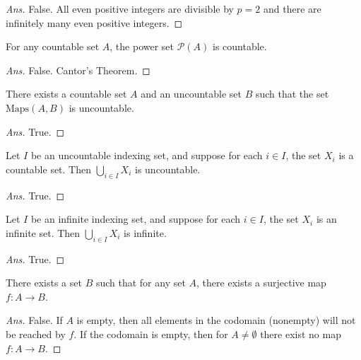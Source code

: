 \documentclass[12pt]{article}
\newenvironment{problem}[2][Problem]{\begin{trivlist}
\item[\hskip \labelsep {\bfseries #1}\hskip \labelsep {\bfseries #2.}]}{\end{trivlist}}
\begin{document}
\begin{proof}[Ans]
False. All even positive integers are divisible by $p = 2$ and there are infinitely many even positive integers.
\end{proof}

\begin{problem}{35}
For any countable set $A$, the power set $\mathcal{P}(A)$ is countable.
\end{problem}

\begin{proof}[Ans]
False. Cantor's Theorem.
\end{proof}

\begin{problem}{36}
There exists a countable set $A$ and an uncountable set $B$ such that the set $\text{Maps}(A, B)$ is uncountable.
\end{problem}

\begin{proof}[Ans]
True.
\end{proof}

\begin{problem}{37}
Let $I$ be an uncountable indexing set, and suppose for each $i \in I$, the set $X_i$ is a countable set. Then $\bigcup_{i \in I} X_i$ is uncountable.
\end{problem}

\begin{proof}[Ans]
True.
\end{proof}

\begin{problem}{38}
Let $I$ be an infinite indexing set, and suppose for each $i \in I$, the set $X_i$ is an infinite set. Then $\bigcup_{i \in I} X_i$ is infinite.
\end{problem}

\begin{proof}[Ans]
True.
\end{proof}

\begin{problem}{39}
There exists a set $B$ such that for any set $A$, there exists a surjective map $f : A \rightarrow B$.
\end{problem}

\begin{proof}[Ans]
False. If $A$ is empty, then all elements in the codomain (nonempty) will not be reached by $f$. If the codomain is empty, then for $A \neq \emptyset$ there exist no map $f : A \rightarrow B$.
\end{proof}
\end{document}
